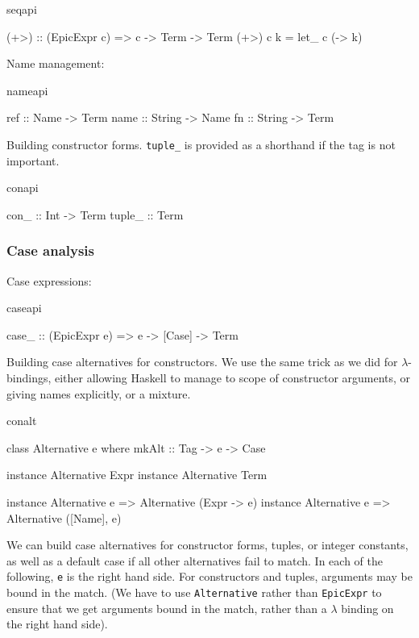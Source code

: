 \begin{SaveVerbatim}{seqapi}

(+>) :: (EpicExpr c) => c -> Term -> Term
(+>) c k = let_ c (\x -> k)

\end{SaveVerbatim}

Name management:

\begin{SaveVerbatim}{nameapi}

ref  :: Name -> Term
name :: String -> Name
fn   :: String -> Term

\end{SaveVerbatim}

Building constructor forms. \texttt{tuple\_} is provided as a
shorthand if the tag is not important.

\begin{SaveVerbatim}{conapi}

con_   :: Int -> Term
tuple_ :: Term

\end{SaveVerbatim}

\subsubsection*{Case analysis}

Case expressions:

\begin{SaveVerbatim}{caseapi}

case_ :: (EpicExpr e) => e -> [Case] -> Term

\end{SaveVerbatim}

Building case alternatives for constructors. We use the same trick as
we did for $\lambda$-bindings, either allowing Haskell to manage to
scope of constructor arguments, or giving names explicitly, or a mixture.

\begin{SaveVerbatim}{conalt}

class Alternative e where
    mkAlt :: Tag -> e -> Case

instance Alternative Expr
instance Alternative Term

instance Alternative e => Alternative (Expr -> e)
instance Alternative e => Alternative ([Name], e)

\end{SaveVerbatim}

We can build case alternatives for constructor forms, tuples, or
integer constants, as well as a default case if all other alternatives
fail to match. In each of the following, \texttt{e} is the right hand
side. For constructors and tuples, arguments may be bound in the
match. (We have to use \texttt{Alternative} rather than
\texttt{EpicExpr} to ensure that we get arguments bound in the match,
rather than a $\lambda$ binding on the right hand side).

